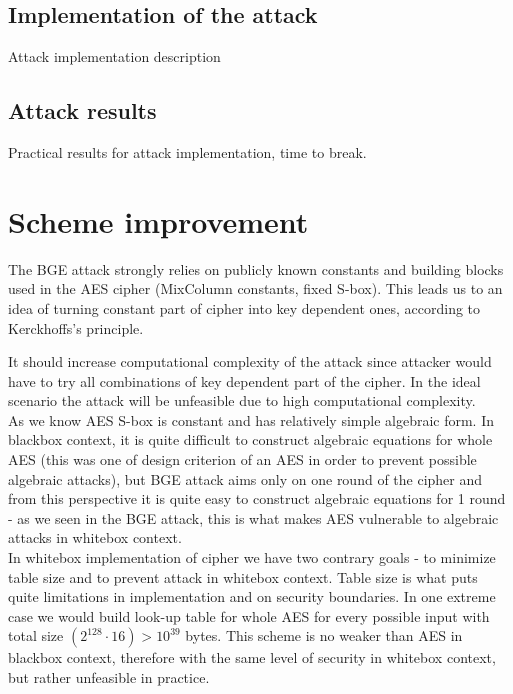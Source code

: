 \documentclass[11pt,oneside,final]{fithesis2}
\begin{document}
    \section{Implementation of the attack}
    Attack implementation description

    \section{Attack results}
    Practical results for attack implementation, time to break.
    
    \chapter{Scheme improvement}
    The BGE attack \citep{Billet:2004:CWB:2080787.2080809} strongly relies on publicly known constants and building blocks used in the AES cipher (MixColumn constants, fixed S-box). 
    This leads us to an idea of turning constant part of cipher into key dependent ones, according to Kerckhoffs's principle. 

    It should increase computational complexity of the attack since attacker would have to try
    all combinations of key dependent part of the cipher. In the ideal scenario the attack will be unfeasible due to high computational complexity. \\
    
    As we know AES S-box is constant and has relatively simple algebraic form. In blackbox context, it is quite difficult to construct algebraic equations for whole AES (this was 
    one of design criterion of an AES in order to prevent possible algebraic attacks), but BGE attack aims only on one round of the cipher and from this perspective it is 
    quite easy to construct algebraic equations for 1 round - as we seen in the BGE attack, this is what makes AES vulnerable to algebraic attacks in whitebox context.\\
    
    In whitebox implementation of cipher we have two contrary goals - to minimize table size and to prevent attack in whitebox context. Table size is what puts quite limitations
    in implementation and on security boundaries. In one extreme case we would build look-up table for whole AES for every possible input with total size 
    $\left(2^{128} \cdot 16\right) > 10^{39}$ bytes. This 
    scheme is no weaker than AES in blackbox context, therefore with the same level of security in whitebox context, but rather unfeasible in practice.
\end{document}
